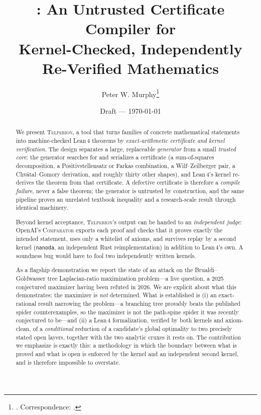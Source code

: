 \documentclass[11pt]{article}
\title{\Telperion: An Untrusted Certificate Compiler for\\
Kernel-Checked, Independently Re-Verified Mathematics}
\author{Peter W. Murphy\thanks{\todo{affiliation, email, ORCID}. Correspondence:
\texttt{\todo{email}}.}}
\date{Draft --- \today}
\theoremstyle{definition}
\theoremstyle{plain}
\newcommand{\Telperion}{\textsc{Telperion}}
\newcommand{\Comparator}{\textsc{Comparator}}
\newcommand{\nanoda}{\texttt{nanoda}}
\newcommand{\Lean}{Lean\,4}
\begin{document}
\maketitle

\begin{abstract}
We present \Telperion, a tool that turns families of concrete mathematical
statements into machine-checked \Lean{} theorems by \emph{exact-arithmetic
certificate and kernel verification}. The design separates a large, replaceable
\emph{generator} from a small \emph{trusted core}: the generator searches for and
serializes a certificate (a sum-of-squares decomposition, a Positivstellensatz
or Farkas combination, a Wilf--Zeilberger pair, a Chv\'atal--Gomory derivation,
and roughly thirty other shapes), and \Lean's kernel re-derives the theorem from
that certificate. A defective certificate is therefore a \emph{compile failure},
never a false theorem; the generator is untrusted by construction, and the same
pipeline proves an unrelated textbook inequality and a research-scale result
through identical machinery.

Beyond kernel acceptance, \Telperion's output can be handed to an
\emph{independent judge}: OpenAI's \Comparator{} exports each proof and checks
that it proves exactly the intended statement, uses only a whitelist of axioms,
and survives replay by a second kernel (\nanoda, an independent Rust
reimplementation) in addition to \Lean's own. A soundness bug would have to fool
two independently written kernels.

As a flagship demonstration we report the state of an attack on the
Brualdi--Goldwasser tree Laplacian-ratio maximization problem---a live question, a
2025 conjectured maximizer having been refuted in 2026. We are explicit about what
this demonstrates: the maximizer is \emph{not} determined. What is established is
(i) an exact-rational result narrowing the problem---a branching tree provably
beats the published spider counterexamples, so the maximizer is not the
path-spine spider it was recently conjectured to be---and (ii) a \Lean{}
formalization, verified by both kernels and axiom-clean, of a \emph{conditional}
reduction of a candidate's global optimality to two precisely stated open layers,
together with the two analytic cruxes it rests on. The contribution we emphasize is
exactly this: a methodology in which the boundary between what is proved and what
is open is enforced by the kernel and an independent second kernel, and is
therefore impossible to overstate.
\end{abstract}
\end{document}
